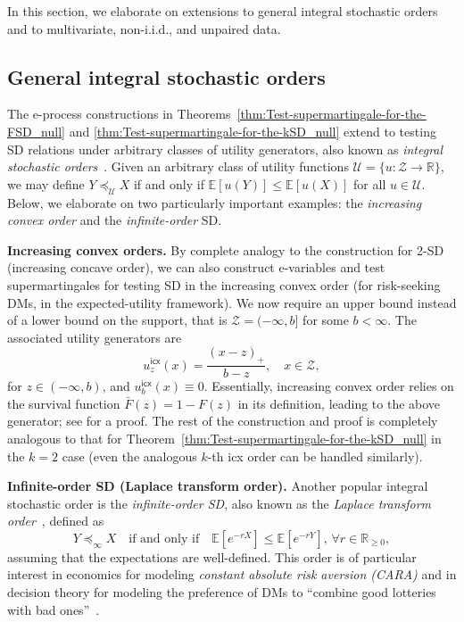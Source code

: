 \documentclass[12pt,twoside]{article}
\theoremstyle{plain}
\theoremstyle{definition}
\theoremstyle{remark}
\newcommand{\R}{\mathbb{R}}
\newcommand{\calU}{\mathcal{U}}
\newcommand{\calZ}{\mathcal{Z}}
\newcommand{\Esymb}{\mathbb{E}}
\newcommand{\ex}[1]{\Esymb\left[{#1}\right]}
\newcommand{\sd}{\preceq}
\begin{document}
In this section, we elaborate on extensions to general integral stochastic orders and to multivariate, non-i.i.d., and unpaired data.


\subsection{General integral stochastic orders}\label{app:integral_stochastic_orders}

The e-process constructions in Theorems~\ref{thm:Test-supermartingale-for-the-FSD_null} and \ref{thm:Test-supermartingale-for-the-kSD_null} extend to testing SD relations under arbitrary classes of utility generators, also known as \emph{integral stochastic orders}~\citep{denuit2002smooth,feng2025integral}. 
Given an arbitrary class of utility functions $\calU = \{u: \calZ \to \R\}$, we may define $Y \sd_{\calU} X$ if and only if $\ex{u(Y)} \leq \ex{u(X)}$ for all $u \in \calU$. Below, we elaborate on two particularly important examples: the \emph{increasing convex order} and the \emph{infinite-order} SD. 




\textbf{Increasing convex orders.} 
By complete analogy to the construction for 2-SD (increasing concave order), we can also construct e-variables and test supermartingales for testing SD in the increasing convex order (for risk-seeking DMs, in the expected-utility framework). We now require an upper bound instead of a lower bound on the support, that is $\calZ=(-\infty,b]$ for some $b<\infty$.
The associated utility generators are
\begin{equation*}\label{eq:utility_generator_icx}
    u_z^{\mathsf{icx}}(x) = \frac{(x - z)_+}{b - z}, \quad x \in \calZ,
\end{equation*}
for $z\in (-\infty,b)$, and $u_b^{\mathsf{icx}}(x)\equiv0$.
Essentially, increasing convex order relies on the survival function $\bar{F}(z) = 1 - F(z)$ in its definition, leading to the above generator; see \citet[][Theorem 1.5.7]{muller2002comparison} for a proof. 
The rest of the construction and proof is completely analogous to that for Theorem~\ref{thm:Test-supermartingale-for-the-kSD_null} in the $k=2$ case (even the analogous $k$-th icx order can be handled similarly). 

\textbf{Infinite-order SD (Laplace transform order).} 
Another popular integral stochastic order is the \emph{infinite-order SD}, also known as the \emph{Laplace transform order}~\citep{fishburn1980continuaunbounded}, defined as
\begin{equation*}\label{eq:infinite_sd}
    Y \sd_{\infty} X \quad \text{if and only if} \quad \ex{e^{-rX}} \leq \ex{e^{-rY}}, \, \forall r \in \R_{\geq 0},
\end{equation*}
assuming that the expectations are well-defined. This order is of particular interest in economics for modeling \emph{constant absolute risk aversion (CARA)} and in decision theory for modeling the preference of DMs to ``combine good lotteries with bad ones''~\citep[e.g.,][]{eeckhoudt2010simplifying}. 
\end{document}
